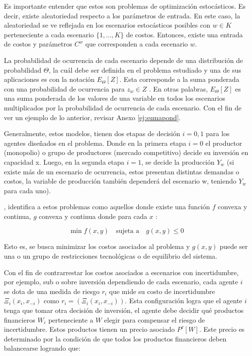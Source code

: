 Es importante entender que estos son problemas de optimización estocásticos. Es decir, existe aleatoriedad respecto a los parámetros de entrada. En este caso, la aleatoriedad se ve reflejada en los escenarios estocásticos posibles con $w \in K$  perteneciente a cada escenario $\{1,...,K\}$ de costos. Entonces, existe una entrada de costos y parámetros $C^{w}$ que corresponden a cada escenario $w$. 

La probabilidad de ocurrencia de cada escenario depende de una distribución de probabilidad $\Theta$, la cuál debe ser definida en el problema estudiado y una de sus aplicaciones es con la notación $E_{\Theta}[Z]$. Esta corresponde a la suma ponderada con una probabilidad de ocurrencia para $z_{w} \in Z$ . En otras palabras, $E_{\Theta}[Z]$ es una suma ponderada de los valores de una variable en todos los escenarios multiplicados por la probabilidad de ocurrencia de cada escenario. Con el fin de ver un ejemplo de lo anterior, revisar Anexo \ref{ej:sumapond}.

Generalmente, estos modelos, tienen dos etapas de decisión $i={0,1}$ para los agentes diseñados en el problema. Donde en la primera etapa $i=0$ el productor (monopolio) o grupo de productores (mercado competitivo) decide su inversión en capacidad x. Luego, en la segunda etapa $i=1$, se decide la producción $Y_{w}$ (si existe más de un escenario de ocurrencia, estos presentan distintas demandas o costos, la variable de producción también dependerá del escenario w, teniendo $Y_{w}$ para cada uno).
\vspace{2.5mm}

 , identifica a estos problemas como aquellos donde existe una función $f$ convexa y continua, $g$ convexa y continua donde para cada $x$ :

$$\min f(x,y)\quad\text{sujeta a}\quad g(x,y)\le 0$$

Esto es, se busca minimizar los costos asociados al problema y $g(x,y)$ puede ser una o un grupo de restricciones tecnológicas o de equilibrio del sistema.
\vspace{2.5mm}

Con el fin de contrarrestar los costos asociados a escenarios con incertidumbre, por ejemplo, sub o sobre inversión dependiendo de cada escenario, cada agente $i$ se dota de una medida de riesgo $r_{i}$ que mide su costo de incertidumbre $\Xi_{i}(x_{i},x_{-i})$ como $r_{i}=(\Xi_{i}(x_{i},x_{-i}))$. Esta configuración logra que el agente $i$ tenga que tomar otra decisión de inversión, el agente debe decidir qué productos financieros  $W_i$ perteneciente a $W$ elegir para compensar el riesgo de incertidumbre. Estos productos tienen un precio asociado $P^{\tau}[W]$. Este precio es determinado por la condición de que todos los productos financieros deben balancearse logrando que:

